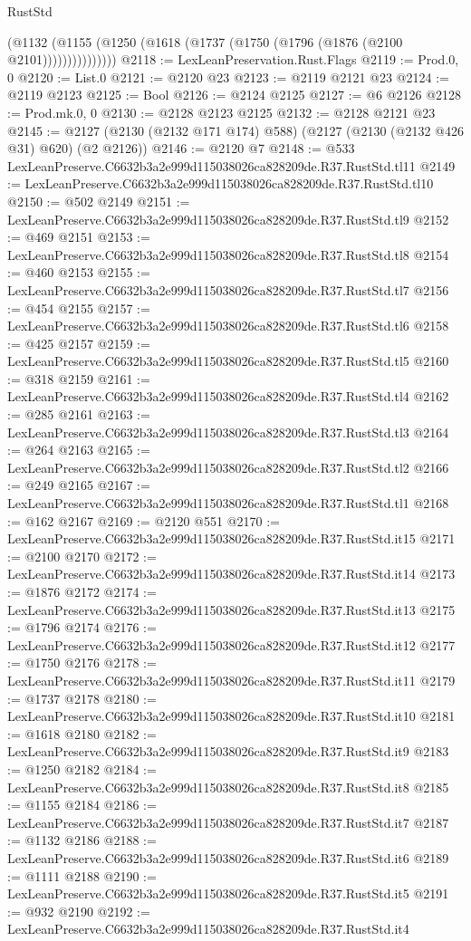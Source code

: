 \begin{lexlean}{RustStd}
\begin{coremodule}
                (@1132 (@1155 (@1250 (@1618 (@1737 (@1750 (@1796 (@1876 (@2100 @2101)))))))))))))))
@2118 := LexLeanPreservation.Rust.Flags
@2119 := Prod.{0, 0}
@2120 := List.{0}
@2121 := @2120 @23
@2123 := @2119 @2121 @23
@2124 := @2119 @2123
@2125 := Bool
@2126 := @2124 @2125
@2127 := @6 @2126
@2128 := Prod.mk.{0, 0}
@2130 := @2128 @2123 @2125
@2132 := @2128 @2121 @23
@2145 := @2127 (@2130 (@2132 @171 @174) @588) (@2127 (@2130 (@2132 @426 @31) @620) (@2 @2126))
@2146 := @2120 @7
@2148 := @533 LexLeanPreserve.C6632b3a2e999d115038026ca828209de.R37.RustStd.tl11
@2149 := LexLeanPreserve.C6632b3a2e999d115038026ca828209de.R37.RustStd.tl10
@2150 := @502 @2149
@2151 := LexLeanPreserve.C6632b3a2e999d115038026ca828209de.R37.RustStd.tl9
@2152 := @469 @2151
@2153 := LexLeanPreserve.C6632b3a2e999d115038026ca828209de.R37.RustStd.tl8
@2154 := @460 @2153
@2155 := LexLeanPreserve.C6632b3a2e999d115038026ca828209de.R37.RustStd.tl7
@2156 := @454 @2155
@2157 := LexLeanPreserve.C6632b3a2e999d115038026ca828209de.R37.RustStd.tl6
@2158 := @425 @2157
@2159 := LexLeanPreserve.C6632b3a2e999d115038026ca828209de.R37.RustStd.tl5
@2160 := @318 @2159
@2161 := LexLeanPreserve.C6632b3a2e999d115038026ca828209de.R37.RustStd.tl4
@2162 := @285 @2161
@2163 := LexLeanPreserve.C6632b3a2e999d115038026ca828209de.R37.RustStd.tl3
@2164 := @264 @2163
@2165 := LexLeanPreserve.C6632b3a2e999d115038026ca828209de.R37.RustStd.tl2
@2166 := @249 @2165
@2167 := LexLeanPreserve.C6632b3a2e999d115038026ca828209de.R37.RustStd.tl1
@2168 := @162 @2167
@2169 := @2120 @551
@2170 := LexLeanPreserve.C6632b3a2e999d115038026ca828209de.R37.RustStd.it15
@2171 := @2100 @2170
@2172 := LexLeanPreserve.C6632b3a2e999d115038026ca828209de.R37.RustStd.it14
@2173 := @1876 @2172
@2174 := LexLeanPreserve.C6632b3a2e999d115038026ca828209de.R37.RustStd.it13
@2175 := @1796 @2174
@2176 := LexLeanPreserve.C6632b3a2e999d115038026ca828209de.R37.RustStd.it12
@2177 := @1750 @2176
@2178 := LexLeanPreserve.C6632b3a2e999d115038026ca828209de.R37.RustStd.it11
@2179 := @1737 @2178
@2180 := LexLeanPreserve.C6632b3a2e999d115038026ca828209de.R37.RustStd.it10
@2181 := @1618 @2180
@2182 := LexLeanPreserve.C6632b3a2e999d115038026ca828209de.R37.RustStd.it9
@2183 := @1250 @2182
@2184 := LexLeanPreserve.C6632b3a2e999d115038026ca828209de.R37.RustStd.it8
@2185 := @1155 @2184
@2186 := LexLeanPreserve.C6632b3a2e999d115038026ca828209de.R37.RustStd.it7
@2187 := @1132 @2186
@2188 := LexLeanPreserve.C6632b3a2e999d115038026ca828209de.R37.RustStd.it6
@2189 := @1111 @2188
@2190 := LexLeanPreserve.C6632b3a2e999d115038026ca828209de.R37.RustStd.it5
@2191 := @932 @2190
@2192 := LexLeanPreserve.C6632b3a2e999d115038026ca828209de.R37.RustStd.it4

\end{coremodule}
\end{lexlean}
